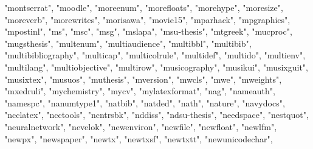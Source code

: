 \documentclass[
]{article}
\newenvironment{Shaded}{\begin{snugshade}}{\end{snugshade}}
\newcommand{\NormalTok}[1]{#1}
\newcommand{\StringTok}[1]{\textcolor[rgb]{0.31,0.60,0.02}{#1}}
\begin{document}
\begin{Shaded}
\begin{Highlighting}[]
\StringTok{"montserrat"}\NormalTok{, }\StringTok{"moodle"}\NormalTok{, }\StringTok{"moreenum"}\NormalTok{, }\StringTok{"morefloats"}\NormalTok{, }\StringTok{"morehype"}\NormalTok{, }
\StringTok{"moresize"}\NormalTok{, }\StringTok{"moreverb"}\NormalTok{, }\StringTok{"morewrites"}\NormalTok{, }\StringTok{"morisawa"}\NormalTok{, }\StringTok{"movie15"}\NormalTok{, }
\StringTok{"mparhack"}\NormalTok{, }\StringTok{"mpgraphics"}\NormalTok{, }\StringTok{"mpostinl"}\NormalTok{, }\StringTok{"ms"}\NormalTok{, }\StringTok{"msc"}\NormalTok{, }\StringTok{"msg"}\NormalTok{, }\StringTok{"mslapa"}\NormalTok{, }
\StringTok{"msu{-}thesis"}\NormalTok{, }\StringTok{"mtgreek"}\NormalTok{, }\StringTok{"mucproc"}\NormalTok{, }\StringTok{"mugsthesis"}\NormalTok{, }\StringTok{"multenum"}\NormalTok{, }
\StringTok{"multiaudience"}\NormalTok{, }\StringTok{"multibbl"}\NormalTok{, }\StringTok{"multibib"}\NormalTok{, }\StringTok{"multibibliography"}\NormalTok{, }
\StringTok{"multicap"}\NormalTok{, }\StringTok{"multicolrule"}\NormalTok{, }\StringTok{"multidef"}\NormalTok{, }\StringTok{"multido"}\NormalTok{, }\StringTok{"multienv"}\NormalTok{, }
\StringTok{"multilang"}\NormalTok{, }\StringTok{"multiobjective"}\NormalTok{, }\StringTok{"multirow"}\NormalTok{, }\StringTok{"musicography"}\NormalTok{, }\StringTok{"musikui"}\NormalTok{, }
\StringTok{"musixguit"}\NormalTok{, }\StringTok{"musixtex"}\NormalTok{, }\StringTok{"musuos"}\NormalTok{, }\StringTok{"muthesis"}\NormalTok{, }\StringTok{"mversion"}\NormalTok{, }\StringTok{"mwcls"}\NormalTok{, }
\StringTok{"mwe"}\NormalTok{, }\StringTok{"mweights"}\NormalTok{, }\StringTok{"mxedruli"}\NormalTok{, }\StringTok{"mychemistry"}\NormalTok{, }\StringTok{"mycv"}\NormalTok{, }\StringTok{"mylatexformat"}\NormalTok{, }
\StringTok{"nag"}\NormalTok{, }\StringTok{"nameauth"}\NormalTok{, }\StringTok{"namespc"}\NormalTok{, }\StringTok{"nanumtype1"}\NormalTok{, }\StringTok{"natbib"}\NormalTok{, }\StringTok{"natded"}\NormalTok{, }
\StringTok{"nath"}\NormalTok{, }\StringTok{"nature"}\NormalTok{, }\StringTok{"navydocs"}\NormalTok{, }\StringTok{"ncclatex"}\NormalTok{, }\StringTok{"ncctools"}\NormalTok{, }\StringTok{"ncntrsbk"}\NormalTok{, }
\StringTok{"nddiss"}\NormalTok{, }\StringTok{"ndsu{-}thesis"}\NormalTok{, }\StringTok{"needspace"}\NormalTok{, }\StringTok{"nestquot"}\NormalTok{, }\StringTok{"neuralnetwork"}\NormalTok{, }
\StringTok{"nevelok"}\NormalTok{, }\StringTok{"newenviron"}\NormalTok{, }\StringTok{"newfile"}\NormalTok{, }\StringTok{"newfloat"}\NormalTok{, }\StringTok{"newlfm"}\NormalTok{, }\StringTok{"newpx"}\NormalTok{, }
\StringTok{"newspaper"}\NormalTok{, }\StringTok{"newtx"}\NormalTok{, }\StringTok{"newtxsf"}\NormalTok{, }\StringTok{"newtxtt"}\NormalTok{, }\StringTok{"newunicodechar"}\NormalTok{, }

\end{Highlighting}
\end{Shaded}
\end{document}
